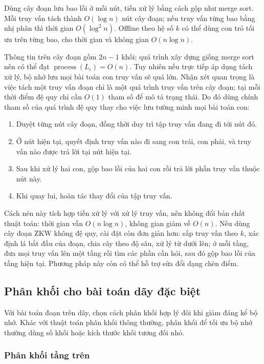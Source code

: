 \documentclass[11pt]{article}
\begin{document}
Dùng cây đoạn lưu bao lồi ở mỗi nút, tiền xử lý bằng cách gộp như merge sort.
Mỗi truy vấn tách thành $O(\log n)$ nút cây đoạn; nếu truy vấn từng bao bằng
nhị phân thì thời gian $O(\log^2 n)$. Offline theo hệ số $k$ có thể dùng con
trỏ tối ưu trên từng bao, cho thời gian và không gian $O(n\log n)$.

Thông tin trên cây đoạn gồm $2n-1$ khối; quá trình xây dựng giống merge sort
nên có thể đạt $\operatorname{process}(L_i)=O(n)$. Tuy nhiên nếu trực tiếp áp
dụng tách xử lý, bộ nhớ lưu mọi bài toán con truy vấn sẽ quá lớn. Nhận xét
quan trọng là việc tách một truy vấn đoạn chỉ là một quá trình truy vấn trên
cây đoạn; tại mỗi thời điểm đệ quy chỉ cần $O(1)$ tham số để mô tả trạng thái.
Do đó dùng chính tham số của quá trình đệ quy thay cho việc lưu tường minh mọi
bài toán con:
\begin{enumerate}
  \item Duyệt từng nút cây đoạn, đồng thời duy trì tập truy vấn đang đi tới nút
  đó.
  \item Ở nút hiện tại, quyết định truy vấn nào đi sang con trái, con phải, và
  truy vấn nào được trả lời tại nút hiện tại.
  \item Sau khi xử lý hai con, gộp bao lồi của hai con rồi trả lời phần truy
  vấn thuộc nút này.
  \item Khi quay lui, hoàn tác thay đổi của tập truy vấn.
\end{enumerate}

Cách nén này tích hợp tiền xử lý với xử lý truy vấn, nên không đổi bản chất
thuật toán: thời gian vẫn $O(n\log n)$, không gian giảm về $O(n)$. Nếu dùng
cây đoạn ZKW không đệ quy, cài đặt còn đơn giản hơn: sắp truy vấn theo $k$,
xác định lá bắt đầu của đoạn, chia cây theo độ sâu, xử lý từ dưới lên; ở mỗi
tầng, đưa mọi truy vấn lên một tầng rồi tìm các phần cần hỏi, sau đó gộp bao
lồi của tầng hiện tại. Phương pháp này còn có thể hỗ trợ sửa đổi dạng chèn
điểm.

\subsection{Phân khối cho bài toán dãy đặc biệt}

Với bài toán đoạn trên dãy, chọn cách phân khối hợp lý đôi khi giảm đáng kể
bộ nhớ. Khác với thuật toán phân khối thông thường, phân khối để tối ưu bộ nhớ
thường dùng số khối hoặc kích thước khối tương đối nhỏ.

\subsubsection{Phân khối tầng trên}
\end{document}
